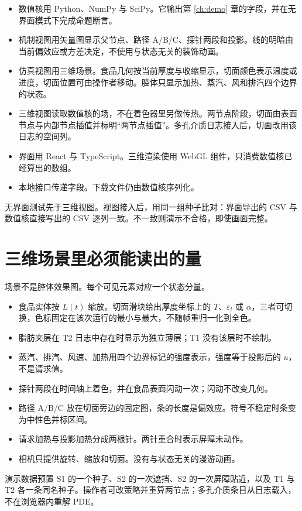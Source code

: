 \begin{itemize}
\item 数值核用 Python、NumPy 与 SciPy。它输出第 \ref{ch:demo} 章的字段，并在无界面模式下完成命题断言。
\item 机制视图用矢量图显示父节点、路径 A/B/C、探针两段和投影。线的明暗由当前偏效应或方差决定，不使用与状态无关的装饰动画。
\item 仿真视图用三维场景。食品几何按当前厚度与收缩显示，切面颜色表示温度或进度，切面位置可由操作者移动。腔体只显示加热、蒸汽、风和排汽四个边界的状态。
\item 三维视图读取数值核的场，不在着色器里另做传热。两节点阶段，切面由表面节点与内部节点插值并标明“两节点插值”。多孔介质日志接入后，切面改用该日志的空间列。
\item 界面用 React 与 TypeScript。三维渲染使用 WebGL 组件，只消费数值核已经算出的数组。
\item 本地接口传递字段。下载文件仍由数值核序列化。
\end{itemize}

无界面测试先于三维视图。视图接入后，用同一组种子比对：界面导出的 CSV 与数值核直接写出的 CSV 逐列一致。不一致则演示不合格，即使画面完整。

\section{三维场景里必须能读出的量}

场景不是腔体效果图。每个可见元素对应一个状态分量。

\begin{itemize}
\item 食品实体按 $L(t)$ 缩放。切面滑块给出厚度坐标上的 $T$、$\varepsilon_l$ 或 $\alpha$，三者可切换，色标固定在该次运行的最小与最大，不随帧重归一化到全色。
\item 脂肪夹层在 T2 日志中存在时显示为独立薄层；T1 没有该层时不绘制。
\item 蒸汽、排汽、风速、加热用四个边界标记的强度表示，强度等于投影后的 $u$，不是请求值。
\item 探针两段在时间轴上着色，并在食品表面闪动一次；闪动不改变几何。
\item 路径 A/B/C 放在切面旁边的固定图，条的长度是偏效应。符号不稳定时条变为中性色并标区间。
\item 请求加热与投影加热分成两根针。两针重合时表示屏障未动作。
\item 相机只提供旋转、缩放和切面。没有与状态无关的漫游动画。
\end{itemize}

演示数据预置 S1 的一个种子、S2 的一次遮挡、S2 的一次屏障贴近，以及 T1 与 T2 各一条同名种子。操作者可改策略并重算两节点；多孔介质条目从日志载入，不在浏览器内重解 PDE。
